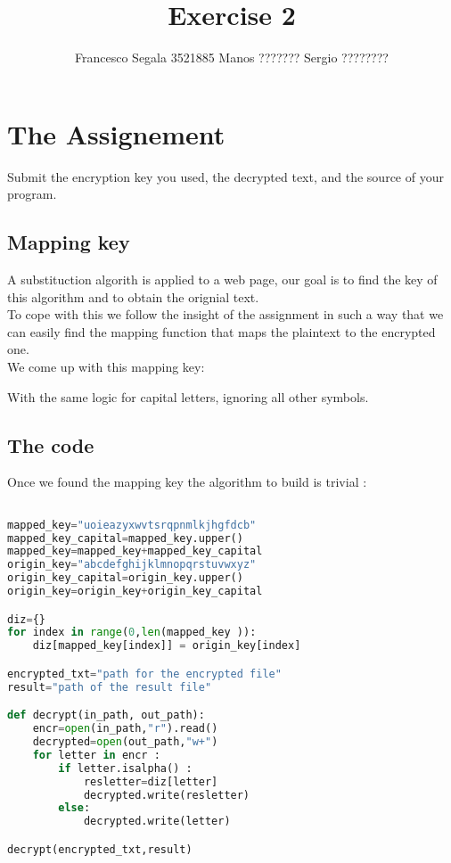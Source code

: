 \documentclass[a4paper,11pt]{article}
\begin{document}
\title{Exercise 2 }
\author{Francesco Segala 3521885 Manos ??????? Sergio ???????? }
\maketitle

\section{The Assignement}
Submit the encryption key you used, the decrypted text, and the source of your program.
\subsection{Mapping key}

A substituction algorith is applied to a web page, our goal is to find the key of this algorithm and to
obtain the orignial text.\\
To cope with this we follow the insight of the assignment in such a way that we can easily find the mapping function
that maps the plaintext to the encrypted one.\\
We come up with this mapping key:

\par

 With the same logic for capital letters, ignoring all other symbols.

\subsection{The code}
Once we found the mapping key the algorithm to build is trivial :


\begin{lstlisting}[language=Python]

mapped_key="uoieazyxwvtsrqpnmlkjhgfdcb"
mapped_key_capital=mapped_key.upper()
mapped_key=mapped_key+mapped_key_capital
origin_key="abcdefghijklmnopqrstuvwxyz"
origin_key_capital=origin_key.upper()
origin_key=origin_key+origin_key_capital

diz={}
for index in range(0,len(mapped_key )):
    diz[mapped_key[index]] = origin_key[index]

encrypted_txt="path for the encrypted file"
result="path of the result file"

def decrypt(in_path, out_path):
    encr=open(in_path,"r").read()
    decrypted=open(out_path,"w+")
    for letter in encr :
        if letter.isalpha() :
            resletter=diz[letter]
            decrypted.write(resletter)
        else:
            decrypted.write(letter)

decrypt(encrypted_txt,result)
\end{lstlisting}
\end{document}

